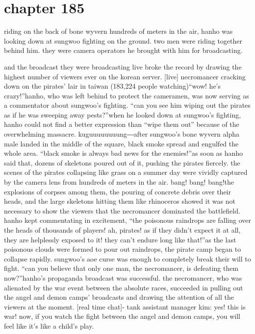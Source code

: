\section{chapter 185}

                            riding on the back of bone wyvern hundreds of meters in the air, hanho was looking down at sungwoo fighting on the ground.
 two men were riding together behind him.
 they were camera operators he brought with him for broadcasting.





and the broadcast they were broadcasting live broke the record by drawing the highest number of viewers ever on the korean server.
[live] necromancer cracking down on the pirates’ lair in taiwan (183,224 people watching)“wow! he’s crazy!”hanho, who was left behind to protect the cameramen, was now serving as a commentator about sungwoo’s fighting.
“can you see him wiping out the pirates as if he was sweeping away pests?”when he looked down at sungwoo’s fighting, hanho could not find a better expression than “wipe them out” because of the overwhelming massacre.
kuguuuuuuuung―after sungwoo’s bone wyvern alpha male landed in the middle of the square, black smoke spread and engulfed the whole area.
“black smoke is always bad news for the enemies!”as soon as hanho said that, dozens of skeletons poured out of it, pushing the pirates fiercely.
 the scenes of the pirates collapsing like grass on a summer day were vividly captured by the camera lens from hundreds of meters in the air.
bang! bang! bang!the explosions of corpses among them, the pouring of concrete debris over their heads, and the large skeletons hitting them like rhinoceros showed it was not necessary to show the viewers that the necromancer dominated the battlefield.
hanho kept commentating in excitement, “the poisonous raindrops are falling over the heads of thousands of players! ah, pirates! as if they didn’t expect it at all, they are helplessly exposed to it! they can’t endure long like that!”as the last poisonous clouds were formed to pour out raindrops, the pirate camp began to collapse rapidly.
 sungwoo’s aoe curse was enough to completely break their will to fight.
“can you believe that only one man, the necromancer, is defeating them now?”hanho’s propaganda broadcast was successful.
 the necromancer, who was alienated by the war event between the absolute races, succeeded in pulling out the angel and demon camps’ broadcasts and drawing the attention of all the viewers at the moment.
[real time chat]- tank assistant manager kim: yes! this is war! now, if you watch the fight between the angel and demon camps, you will feel like it’s like a child’s play.

